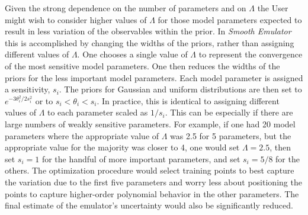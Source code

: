 \documentclass[UserManual.tex]{subfiles}
\begin{document}
Given the strong dependence on the number of parameters and on $\Lambda$ the User might wish to consider higher values of $\Lambda$ for those model parameters expected to result in less variation of the observables within the prior. In {\it Smooth Emulator} this is accomplished by changing the widths of the priors, rather than assigning different values of $\Lambda$. One chooses a single value of $\Lambda$ to represent the convergence of the most sensitive model parameters. One then reduces the widths of the priors for the less important model parameters. Each model parameter is assigned a sensitivity, $s_i$. The priors for Gaussian and uniform distributions are then set to $e^{-3\theta_i^2/2s_i^2}$ or to $s_i<\theta_i<s_i$. In practice, this is identical to assigning different values of $\Lambda$ to each parameter scaled as $1/s_i$. This can be especially if there are large numbers of weakly sensitive parameters. For example, if one had 20 model parameters where the appropriate value of $\Lambda$ was 2.5 for 5 parameters, but the appropriate value for the majority was closer to 4, one would set $\Lambda=2.5$, then set $s_i=1$ for the handful of more important parameters, and set $s_i=5/8$ for the others. The optimization procedure would select training points to best capture the variation due to the first five parameters and worry less about positioning the points to capture higher-order polynomial behavior in the other parameters. The final estimate of the emulator's uncertainty would also be significantly reduced.
\end{document}
